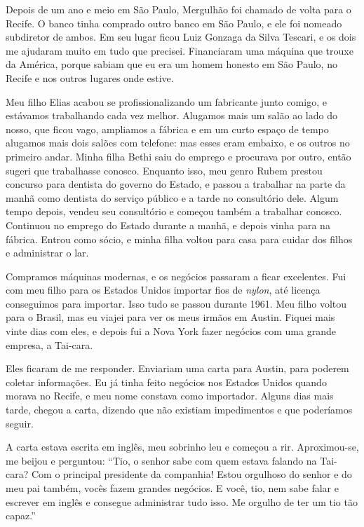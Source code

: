 Depois de um ano e meio em São Paulo, Mergulhão foi chamado de volta
para o Recife. O banco tinha comprado outro banco em São Paulo, e
ele foi nomeado subdiretor de ambos. Em seu lugar ficou Luiz Gonzaga da
Silva Tescari, e os dois me ajudaram muito em tudo que precisei.
Financiaram uma máquina que trouxe da América, porque sabiam que eu era
um homem honesto em São Paulo, no Recife e nos outros lugares onde estive.

Meu filho Elias acabou se profissionalizando um fabricante junto comigo, e
estávamos trabalhando cada vez melhor. Alugamos mais um salão ao lado do
nosso, que ficou vago, ampliamos a fábrica e em um curto espaço de
tempo alugamos mais dois salões com telefone: mas esses eram
embaixo, e os outros no primeiro andar. Minha filha Bethi saiu do
emprego e procurava por outro, então sugeri que trabalhasse
conosco. Enquanto isso, meu genro Rubem prestou concurso para dentista do governo do
Estado, e passou a trabalhar na parte da manhã como dentista do serviço
público e a tarde no consultório dele. Algum tempo depois, vendeu seu
consultório e começou também a trabalhar conosco. Continuou
no emprego do Estado durante a manhã, e depois vinha para na fábrica. Entrou 
como sócio, e minha filha voltou para casa para cuidar dos filhos e
administrar o lar.

Compramos máquinas modernas, e os negócios passaram a ficar excelentes. Fui com
meu filho para os Estados Unidos importar fios de \textit{nylon}, até
licença conseguimos para importar. Isso tudo se passou durante 1961. 
Meu filho voltou para o Brasil, mas eu viajei para ver os
meus irmãos em Austin. Fiquei mais vinte dias com eles, e depois fui a
Nova York fazer negócios com uma grande empresa, a Tai-cara.

Eles ficaram de me responder. Enviariam uma carta para Austin, para poderem 
coletar informações. Eu já tinha feito negócios nos Estados
Unidos quando morava no Recife, e meu nome constava como importador.
Alguns dias mais tarde, chegou a carta, dizendo que não
existiam impedimentos e que poderíamos seguir. 

A carta estava
escrita em inglês, meu sobrinho leu e começou a rir. Aproximou-se, me
beijou e perguntou: ``Tio, o senhor sabe com quem estava falando na Tai-cara? Com
o principal presidente da companhia! Estou orgulhoso do senhor e do
meu pai também, vocês fazem grandes negócios. E você, tio, nem sabe
falar e escrever em inglês e consegue administrar tudo isso. Me orgulho
de ter um tio tão capaz.''


